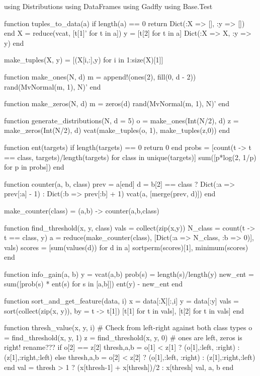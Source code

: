 \documentclass[a4paper,12pt]{article}
\begin{document}
\begin{juliacode}
using Distributions
using DataFrames
using Gadfly
using Base.Test

function tuples_to_data(a)
    if length(a) == 0
        return Dict(:X => [], :y => [])
    end
    X = reduce(vcat, [t[1]' for t in a])
    y  = [t[2] for t in a]
    Dict(:X => X, :y => y)
end

make_tuples(X, y) = [(X[i,:],y) for i in 1:size(X)[1]]

function make_ones(N, d)
    m = append!(ones(2), fill(0, d - 2))
    rand(MvNormal(m, 1), N)'
end

function make_zeros(N, d)
    m = zeros(d)
    rand(MvNormal(m, 1), N)'
end

function generate_distributions(N, d = 5)
    o = make_ones(Int(N/2), d)
    z = make_zeros(Int(N/2), d)
    vcat(make_tuples(o, 1), make_tuples(z,0))
end

function ent(targets)
    if length(targets) == 0
        return 0
    end
    probs = [count(t -> t == class, targets)/length(targets) for class in unique(targets)]
    sum([p*log(2, 1/p) for p in probs])
end

function counter(a, b, class)
    prev = a[end]
    d = b[2] == class ?
        Dict(:a => prev[:a] - 1) :
        Dict(:b => prev[:b] + 1)
    vcat(a, [merge(prev, d)])
end


make_counter(class) = (a,b) -> counter(a,b,class)

function find_threshold(x, y, class)
    vals = collect(zip(x,y))
    N_class = count(t -> t == class, y)
    a = reduce(make_counter(class), [Dict(:a => N_class, :b => 0)], vals)
    scores = [sum(values(d)) for d in a]
    sortperm(scores)[1], minimum(scores)
end


function info_gain(a, b)
    y = vcat(a,b)
    prob(s) = length(s)/length(y)
    new_ent = sum([prob(s) * ent(s) for s in [a,b]])
    ent(y) - new_ent
end

function sort_and_get_feature(data, i)
    x = data[:X][:,i]
    y = data[:y]
    vals = sort(collect(zip(x, y)), by = t -> t[1])
    [t[1] for t in vals], [t[2] for t in vals]
end

function thresh_value(x, y, i)
    # Check from left-right against both class types
    o = find_threshold(x, y, 1)
    z = find_threshold(x, y, 0)
    # ones are left, zeros is right! rename???
    if o[2] == z[2]
        thresh,a,b = o[1] < z[1] ? (o[1],:left, :right) : (z[1],:right,:left)
    else
        thresh,a,b = o[2] < z[2] ? (o[1],:left, :right) : (z[1],:right,:left)
    end
    val = thresh > 1 ? (x[thresh-1] + x[thresh])/2 : x[thresh]
    val, a, b
end


\end{juliacode}
\end{document}
